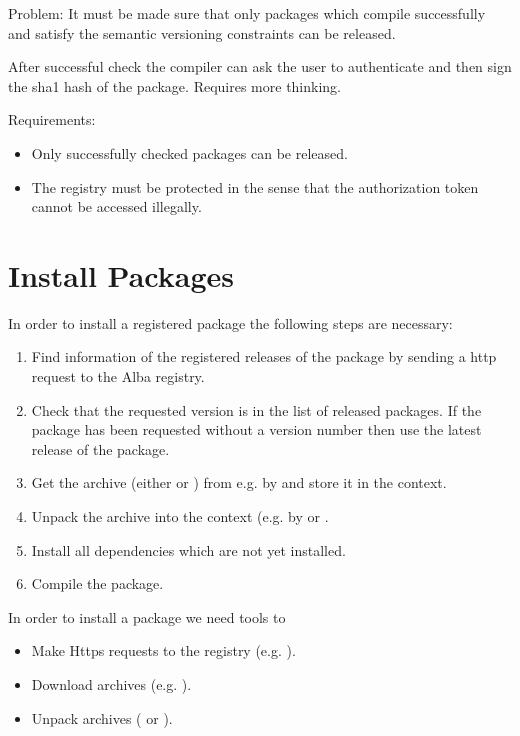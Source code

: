 Problem: It must be made sure that only packages which compile successfully
and satisfy the semantic versioning constraints can be released.

After successful check the compiler can ask the user to authenticate and then
sign the sha1 hash of the package. Requires more thinking.

Requirements:
\begin{itemize}
\item Only successfully checked packages can be released.
\item The registry must be protected in the sense that the authorization token
  cannot be accessed illegally.
\end{itemize}




\section{Install Packages}

In order to install a registered package  the following
steps are necessary:
\begin{enumerate}

\item Find information of the registered releases of the package
   by sending a http request to the Alba registry.

\item Check that the requested version is in the list of released packages. If
  the package has been requested without a version number then use the latest
  release of the package.

\item Get the archive (either  or ) from
   e.g. by  and store it in the context.

\item Unpack the archive into the context (e.g. by 
  or .

\item Install all dependencies which are not yet installed.

\item Compile the package.
\end{enumerate}


\noindent In order to install a package we need tools to
%
\begin{itemize}
\item Make Https requests to the registry (e.g. ).
\item Download archives (e.g. ).
\item Unpack archives ( or ).
\end{itemize}


